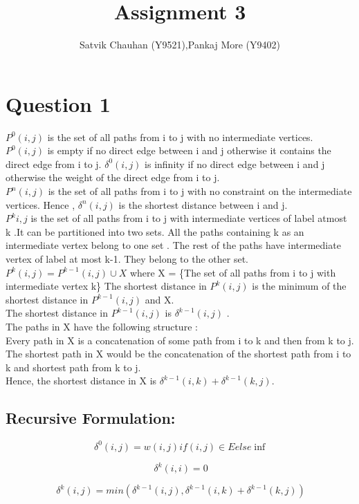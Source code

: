 \documentclass[11pt]{article}
\title{Assignment 3}
\author{Satvik Chauhan (Y9521),Pankaj More (Y9402)}
\begin{document}
\maketitle
\section*{Question 1}

$P^0(i,j)$ is the set of all paths from i to j with no intermediate vertices.
$P^0(i,j)$ is empty if no direct edge between i and j otherwise it contains the direct edge from i to j.
$\delta^0(i,j)$ is infinity if no direct edge between i and j otherwise the weight of the direct edge from i to j. 
\\
$P^n(i,j)$ is the set of all paths from i to j with no constraint on the intermediate vertices. 
Hence , $\delta^n(i,j)$ is the shortest distance between i and j. 
\\
$P^k{i,j}$ is the set of all paths from i to j with intermediate vertices of label atmost k .It can be partitioned into two sets. All the paths containing k as an intermediate vertex belong to one set . The rest of the paths have intermediate vertex of label at most k-1. They belong to the other set.
\\
$P^k(i,j) = P^{k-1}(i,j) \cup X $ where X =  \{The set of all paths from i to j with intermediate vertex k\} 
The shortest distance in $P^k(i,j)$ is the minimum of the shortest distance in $P^{k-1}(i,j)$ and X. \\
The shortest distance in $P^{k-1}(i,j)$ is $\delta^{k-1}(i,j)$ . \\
The paths in X have the following structure : \\
Every path in X is a concatenation of some path from i to k and then from k to j. \\
The shortest path in X would be the concatenation of the shortest path from i to k and shortest path from k to j. \\
Hence, the shortest distance in X is $\delta^{k-1}(i,k) + \delta^{k-1}(k,j)$. \\

\subsection*{Recursive Formulation:}

\[
\ \delta^0(i,j) = w(i,j) if (i,j) \in E else \inf 
\]

\[
\ \delta^k(i,i) = 0
\]

\[
\ \delta^k(i,j) = min ( \delta^{k-1}(i,j) , \delta^{k-1}(i,k) + \delta^{k-1}(k,j) )
\]
\end{document}
